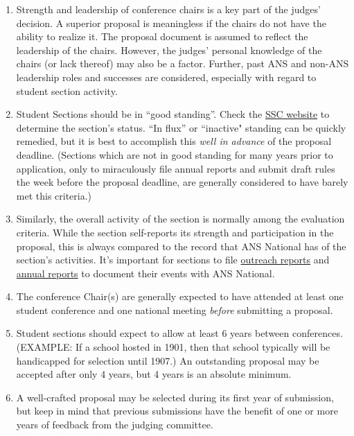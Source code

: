 \documentclass[12pt]{article}
\begin{document}
\begin{enumerate}
\item{Strength and leadership of conference chairs is a key part of the judges’ decision.
A superior proposal is meaningless if the chairs do not have the ability to realize
it. The proposal document is assumed to reflect the leadership of the chairs.
However, the judges’ personal knowledge of the chairs (or lack thereof) may also
be a factor. Further, past ANS and non-ANS leadership roles and successes are
considered, especially with regard to student section activity.}
\item{Student Sections should be in “good standing”. Check the \href{http://students.ans.org/section-standing/}{SSC website} to
determine the section’s status. ``In flux” or ``inactive" standing can be quickly remedied, but it is best to accomplish this \emph{well in advance} of the proposal deadline.
(Sections which are not in good standing for many years prior to application, only to
miraculously file annual reports and submit draft rules the week before the
proposal deadline, are generally considered to have barely met this criteria.)}
\item{Similarly, the overall activity of the section is normally among the evaluation
criteria. While the section self-reports its strength and participation in the proposal, this is always compared to the record that ANS National has of the section’s activities. It’s important for sections to file \href{http://students.ans.org/outreach/}{outreach reports} and \href{http://students.ans.org/section-standing/}{annual reports} to document their events with ANS National.}
\item{The conference Chair(s) are generally expected to have attended at least one
student conference and one national meeting \textit{before} submitting a proposal.}
\item{Student sections should expect to allow at least 6 years between conferences.
(EXAMPLE: If a school hosted in 1901, then that school typically will be
handicapped for selection until 1907.) An outstanding proposal may be accepted
after only 4 years, but 4 years is an absolute minimum.}
\item{A well-crafted proposal may be selected during its first year of submission, but keep in mind that previous submissions have the benefit of one or more years of feedback from the judging committee.}

\end{enumerate}

\newpage
\end{document}
